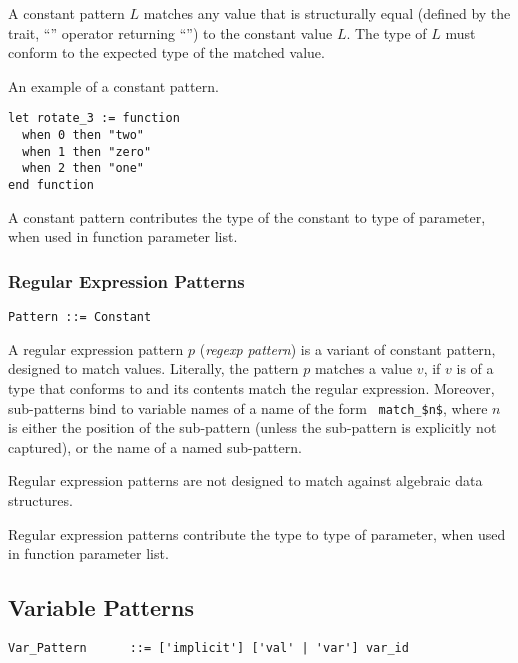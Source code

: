 A constant pattern $L$ matches any value that is structurally equal (defined by the  trait, ``\code{=}'' operator returning ``'') to the constant value $L$. The type of $L$ must conform to the expected type of the matched value. 

\example An example of a constant pattern. 
\begin{lstlisting}
let rotate_3 := function
  when 0 then "two"
  when 1 then "zero"
  when 2 then "one"
end function
\end{lstlisting}

A constant pattern contributes the type of the constant to type of parameter, when used in function parameter list. 





\subsubsection{Regular Expression Patterns}
\label{sec:regexp-patterns}

\syntax\begin{lstlisting}
Pattern ::= Constant
\end{lstlisting}

A regular expression pattern $p$ ({\em regexp pattern}) is a variant of constant pattern, designed to match  values. Literally, the pattern $p$ matches a value $v$, if $v$ is of a type that conforms to  and its contents match the regular expression. Moreover, sub-patterns bind to variable names of a name of the form ~\lstinline!match_$n$!, where $n$ is either the position of the sub-pattern (unless the sub-pattern is explicitly not captured), or the name of a named sub-pattern. 

Regular expression patterns are not designed to match against algebraic data structures. 

Regular expression patterns contribute the  type to type of parameter, when used in function parameter list. 






\subsection{Variable Patterns}
\label{sec:variable-patterns}

\syntax\begin{lstlisting}
Var_Pattern      ::= ['implicit'] ['val' | 'var'] var_id
\end{lstlisting}

